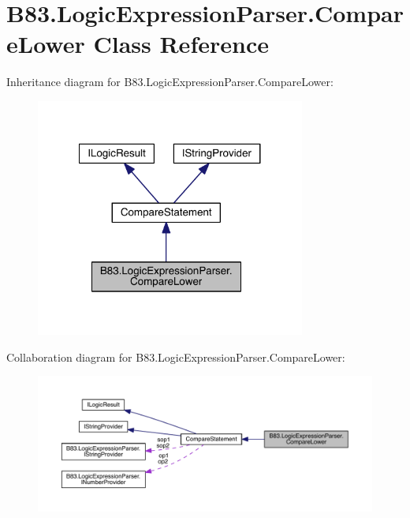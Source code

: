 \hypertarget{class_b83_1_1_logic_expression_parser_1_1_compare_lower}{}\section{B83.\+Logic\+Expression\+Parser.\+Compare\+Lower Class Reference}
\label{class_b83_1_1_logic_expression_parser_1_1_compare_lower}


Inheritance diagram for B83.\+Logic\+Expression\+Parser.\+Compare\+Lower\+:\nopagebreak
\begin{figure}[H]
\begin{center}
\leavevmode
\includegraphics[width=251pt]{class_b83_1_1_logic_expression_parser_1_1_compare_lower__inherit__graph}
\end{center}
\end{figure}


Collaboration diagram for B83.\+Logic\+Expression\+Parser.\+Compare\+Lower\+:\nopagebreak
\begin{figure}[H]
\begin{center}
\leavevmode
\includegraphics[width=350pt]{class_b83_1_1_logic_expression_parser_1_1_compare_lower__coll__graph}
\end{center}
\end{figure}
